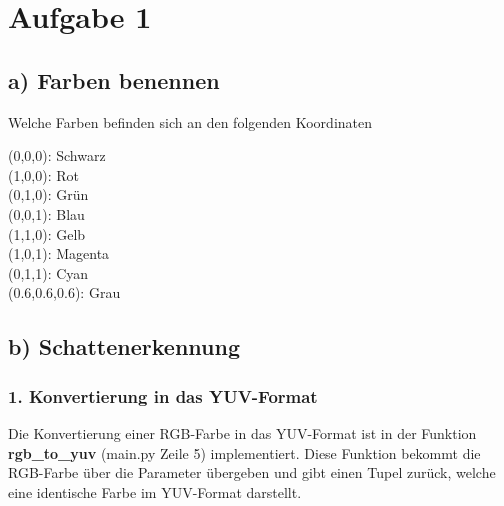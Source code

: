 \documentclass[12pt]{article}
\begin{document}

\section*{Aufgabe 1}
\subsection*{a) Farben benennen}
Welche Farben befinden sich an den folgenden Koordinaten

(0,0,0): Schwarz\\
(1,0,0): Rot\\
(0,1,0): Grün\\
(0,0,1): Blau\\
(1,1,0): Gelb\\
(1,0,1): Magenta\\
(0,1,1): Cyan\\
(0.6,0.6,0.6): Grau

\newpage

\subsection*{b) Schattenerkennung}
\subsubsection*{1. Konvertierung in das YUV-Format}
Die Konvertierung einer RGB-Farbe in das YUV-Format ist in der Funktion \textbf{rgb\_to\_yuv} (main.py Zeile 5) implementiert. Diese Funktion bekommt die RGB-Farbe über die Parameter übergeben und gibt einen Tupel zurück, welche eine identische Farbe im YUV-Format darstellt.
\end{document}
